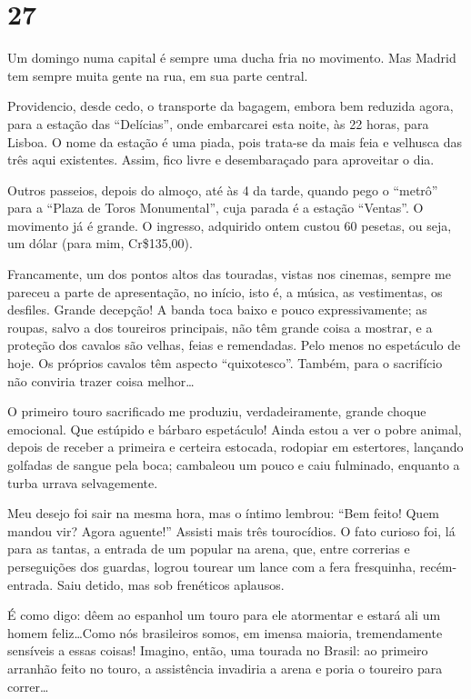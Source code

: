 \section*{27 \adfflatleafright {}}
Um domingo numa capital é sempre uma ducha fria no movimento. Mas Madrid tem sempre muita gente na rua, em sua parte central.

Providencio, desde cedo, o transporte da bagagem, embora bem reduzida agora, para a estação das ``Delícias'', onde embarcarei esta noite, às 22 horas, para Lisboa. O nome da estação é uma piada, pois trata-se da mais feia e velhusca das três aqui existentes. Assim, fico livre e desembaraçado para aproveitar o dia.

Outros passeios, depois do almoço, até às 4 da tarde, quando pego o ``metrô'' para a ``Plaza de Toros Monumental'', cuja parada é a estação ``Ventas''. O movimento já é grande. O ingresso, adquirido ontem custou 60 pesetas, ou seja, um dólar (para mim, Cr\$135,00).

Francamente, um dos pontos altos das touradas, vistas nos cinemas, sempre me pareceu a parte de apresentação, no início, isto é, a música, as vestimentas, os desfiles. Grande decepção! A banda toca baixo e pouco expressivamente; as roupas, salvo a dos toureiros principais, não têm grande coisa a mostrar, e a proteção dos cavalos são velhas, feias e remendadas. Pelo menos no espetáculo de hoje. Os próprios cavalos têm aspecto ``quixotesco''. Também, para o sacrifício não conviria trazer coisa melhor\ldots

O primeiro touro sacrificado me produziu, verdadeiramente, grande choque emocional. Que estúpido e bárbaro espetáculo! Ainda estou a ver o pobre animal, depois de receber a primeira e certeira estocada, rodopiar em estertores, lançando golfadas de sangue pela boca; cambaleou um pouco e caiu fulminado, enquanto a turba urrava selvagemente.

Meu desejo foi sair na mesma hora, mas o íntimo lembrou: ``Bem feito! Quem mandou vir? Agora aguente!'' Assisti mais três tourocídios. O fato curioso foi, lá para as tantas, a entrada de um popular na arena, que, entre correrias e perseguições dos guardas, logrou tourear um lance com a fera fresquinha, recém- entrada. Saiu detido, mas sob frenéticos aplausos.

É como digo: dêem ao espanhol um touro para ele atormentar e estará ali um homem feliz\ldots Como nós brasileiros somos, em imensa maioria, tremendamente sensíveis a essas coisas! Imagino, então, uma tourada no Brasil: ao primeiro arranhão feito no touro, a assistência invadiria a arena e poria o toureiro para correr\ldots

